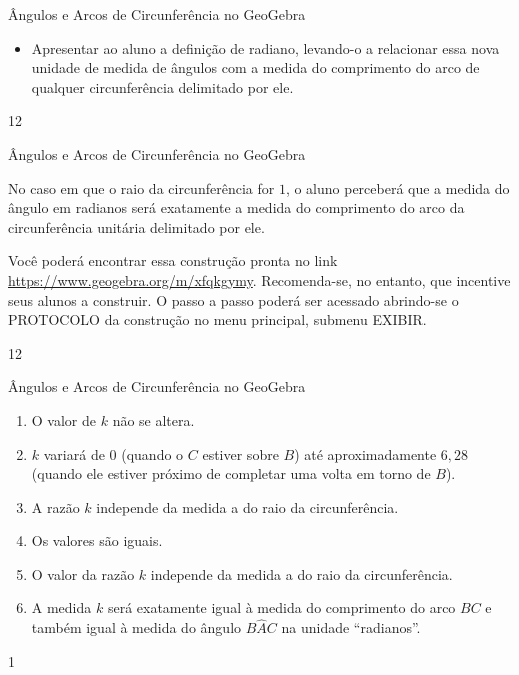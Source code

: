 \begin{objectives}{Ângulos e Arcos de Circunferência no GeoGebra}
{
\begin{itemize}
\item Apresentar ao aluno a definição de radiano, levando-o a relacionar essa nova unidade de medida de ângulos com a medida do comprimento do arco de qualquer circunferência delimitado por ele.
\end{itemize}
}{1}{2}
\end{objectives}
\begin{sugestions}{Ângulos e Arcos de Circunferência no GeoGebra}
{
No caso em que o raio da circunferência for $1$, o aluno perceberá que a medida do ângulo em radianos será exatamente a medida do comprimento do arco da circunferência unitária delimitado por ele.

Você poderá encontrar essa construção pronta no link \url{https://www.geogebra.org/m/xfqkgymy}. Recomenda-se, no entanto, que incentive seus alunos a construir. O passo a passo poderá ser acessado abrindo-se o PROTOCOLO da construção no menu principal, submenu EXIBIR.
}{1}{2}
\end{sugestions}
\begin{answer}{Ângulos e Arcos de Circunferência no GeoGebra}
{
\begin{enumerate}
\item O valor de $k$ não se altera. 
\item $k$ variará de $0$ (quando o $C$ estiver sobre $B$) até aproximadamente $6{,}28$ (quando ele estiver próximo de completar uma volta em torno de $B$).
\item A razão $k$ independe da medida a do raio da
circunferência.
\item Os valores são iguais.
\item O valor da razão $k$ independe da medida a do raio da
circunferência.
\item A medida $k$ será exatamente igual à medida do comprimento do arco $BC$ e também igual à medida do ângulo $B\hat{A}C$ na unidade “radianos”.
\end{enumerate}
}{1}
\end{answer}
\label{trig-exp2}

